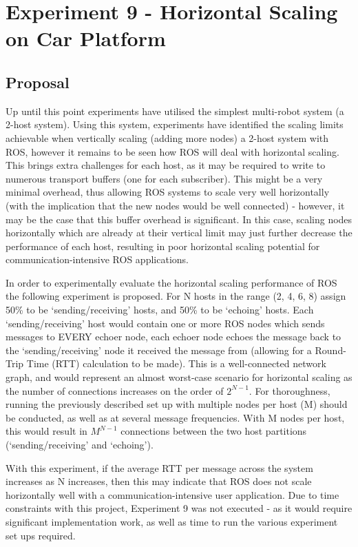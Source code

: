 \documentclass[../dissertation.tex]{subfiles}
\begin{document}
\section{Experiment 9 - Horizontal Scaling on Car Platform}
\label{experiment9-horizontal-scaling}

\subsection{Proposal}

Up until this point experiments have utilised the simplest multi-robot system (a 2-host system). Using this system, experiments have identified the scaling limits achievable when vertically scaling (adding more nodes) a 2-host system with ROS, however it remains to be seen how ROS will deal with horizontal scaling. This brings extra challenges for each host, as it may be required to write to numerous transport buffers (one for each subscriber). This might be a very minimal overhead, thus allowing ROS systems to scale very well horizontally (with the implication that the new nodes would be well connected) - however, it may be the case that this buffer overhead is significant. In this case, scaling nodes horizontally which are already at their vertical limit may just further decrease the performance of each host, resulting in poor horizontal scaling potential for communication-intensive ROS applications.

In order to experimentally evaluate the horizontal scaling performance of ROS the following experiment is proposed. For N hosts in the range (2, 4, 6, 8) assign 50\% to be `sending/receiving' hosts, and 50\% to be `echoing' hosts. Each `sending/receiving' host would contain one or more ROS nodes which sends messages to EVERY echoer node, each echoer node echoes the message back to the `sending/receiving' node it received the message from (allowing for a Round-Trip Time (RTT) calculation to be made). This is a well-connected network graph, and would represent an almost worst-case scenario for horizontal scaling as the number of connections increases on the order of $2^{N-1}$. For thoroughness, running the previously described set up with multiple nodes per host (M) should be conducted, as well as at several message frequencies. With M nodes per host, this would result in $M^{N-1}$ connections between the two host partitions (`sending/receiving' and `echoing').

With this experiment, if the average RTT per message across the system increases as N increases, then this may indicate that ROS does not scale horizontally well with a communication-intensive user application. Due to time constraints with this project, Experiment 9 was not executed - as it would require significant implementation work, as well as time to run the various experiment set ups required.
\end{document}
